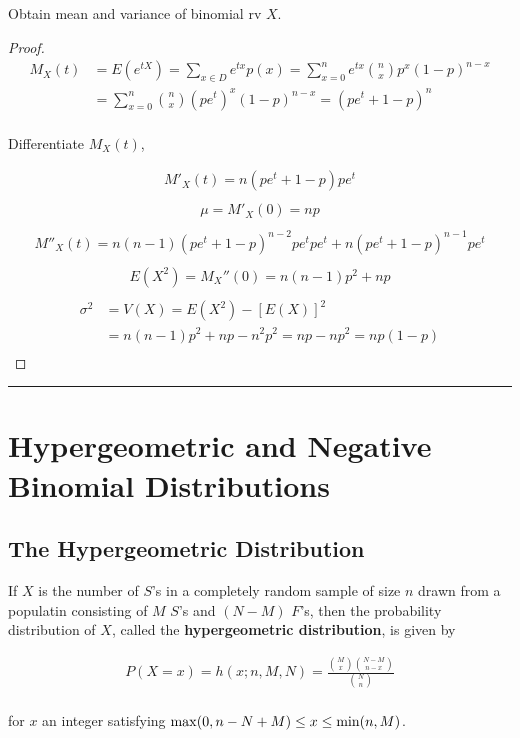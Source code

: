 Obtain mean and variance of binomial rv $X$.

\begin{proof}
    \begin{align*}
        M_X(t) & = E(e^{tX}) = \sum\limits_{x\in D} e^{tx} p(x) = \sum\limits_{x=0}^n e^{tx}{n\choose x} p^x (1-p)^{n-x} \\
        & = \sum\limits_{x=0}^n {n\choose x}(pe^t)^x(1-p)^{n-x} = (pe^t + 1 - p) ^ n \\
    \end{align*}

    Differentiate $M_X(t)$,

    \begin{align*}
        M'_X(t) = n(pe^t + 1 - p)pe^t \\
    \end{align*}
    \begin{align*}
        \mu = M'_X(0) = np \\
    \end{align*}
    \begin{align*}
        M''_X(t) = n(n - 1)(pe^t + 1 - p) ^{n-2} pe^tpe^t + n(pe^t + 1 - p)^{n - 1}pe^t \\
    \end{align*}
    \begin{align*}
        E(X^2) = M_X''(0) = n(n - 1)p^2 + np \\
    \end{align*}
    \begin{align*}
        \sigma^2 & = V(X) = E(X^2) - [E(X)]^2 \\
        & = n(n - 1)p^2 + np - n^2p^2 = np - np^2 = np(1 - p) \\
    \end{align*}
\end{proof}

\noindent\rule{\textwidth}{1pt}

\section{Hypergeometric and Negative Binomial Distributions}

\subsection{The Hypergeometric Distribution}

\begin{proposition}
    If $X$ is the number of $S$'s in a completely random sample of size $n$ drawn from a populatin consisting of $M$ $S$'s and $(N-M)$ $F$'s, then  the probability distribution of $X$, called the \textbf{hypergeometric distribution}, is given by 
    
    \begin{align*}
        P(X = x) = h(x;n, M, N) = \frac{{M\choose x}{N-M\choose n-x}}{{N\choose n}} \\
    \end{align*}

    for $x$ an integer satisfying ${\rm max}(0, n - N + M)\leq x \leq {\rm min}(n, M)$.
\end{proposition}

